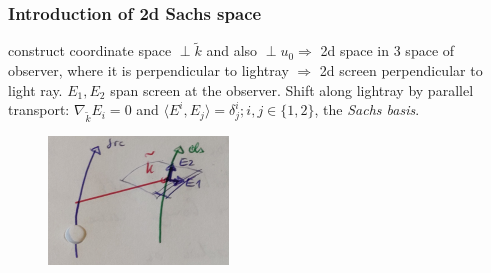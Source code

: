 	\subsubsection{Introduction of 2d Sachs space}
	construct coordinate space $\perp \tilde{k}$ and also $\perp u_0 \Rightarrow$ 2d space in 3 space of observer, where it is perpendicular to lightray $\Rightarrow$ 2d screen perpendicular to light ray. $E_1,E_2$ span screen at the observer. Shift along lightray by parallel transport: $\nabla_{\tilde{k}}E_i=0$ and $\langle E^i,E_j \rangle = \delta^i_j; i,j \in \{1,2\}$, the \emph{Sachs basis}.\\
	\begin{figure}
		\centering
		\includegraphics[width=0.7\linewidth]{gfx/gravlensingSachsbasis}
		\caption{}
		\label{fig:gravlensingsachsbasis}
	\end{figure}
	
